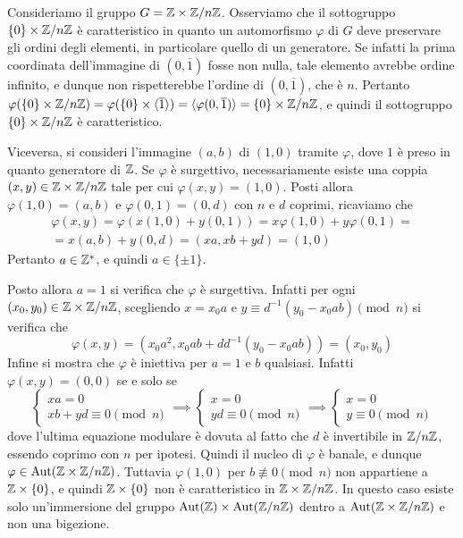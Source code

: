 \documentclass[11pt]{scrartcl}
\begin{document}
	\begin{example}
		Consideriamo il gruppo $G = \mathbb Z \times {\mathbb Z}/n{\mathbb Z}$. Osserviamo che il sottogruppo 
		$\{0\}\times {\mathbb Z}/n{\mathbb Z}$ è caratteristico in quanto un automorfismo $\varphi$ di $G$ deve
		preservare gli ordini degli elementi, in particolare quello di un generatore. Se
		infatti la prima coordinata dell'immagine di $(0, \overline{1})$ fosse non nulla,
		tale elemento avrebbe ordine infinito, e dunque non rispetterebbe l'ordine
		di $(0, \overline{1})$, che è $n$. 
		Pertanto $\varphi(\{0\} \times {\mathbb Z}/n{\mathbb Z}) = \varphi(\{0\} \times \langle \overline{1} \rangle) =
		\langle \varphi(0, \overline{1}) \rangle = \{0\} \times {\mathbb Z}/n{\mathbb Z}$, e quindi il
		sottogruppo $\{0\} \times {\mathbb Z}/n{\mathbb Z}$ è caratteristico. \medskip
		

        Viceversa, si consideri l'immagine $(a, b)$ di $(1, 0)$ tramite $\varphi$, dove $1$ è preso in quanto generatore
        di $\mathbb Z$. Se $\varphi$ è
		surgettivo, necessariamente esiste una coppia $(x, y) \in \mathbb Z\times {\mathbb Z}/n{\mathbb Z}$ tale per cui
		$\varphi(x, y) = (1, 0)$. Posti allora $\varphi(1, 0) = (a, b)$ e
		$\varphi(0, 1) = (0, d)$ con $n$ e $d$ coprimi, ricaviamo che
		\begin{multline*}
			\varphi(x, y) = \varphi(x(1, 0) + y(0, 1)) = x\varphi(1, 0) + y\varphi(0, 1) = \\
			= x(a, b) + y(0, d) = (xa, xb + yd) = (1, 0)
		\end{multline*}
		Pertanto $a \in \mathbb Z^*$, e quindi $a \in \{\pm 1\}$. \medskip
		

		Posto allora $a = 1$ si verifica che $\varphi$ è surgettiva. Infatti 
		per ogni $(x_0, y_0) \in \mathbb Z\times{\mathbb Z}/n{\mathbb Z}$, scegliendo
		$x = x_0a$ e $y \equiv d^{-1}(y_0 - x_0ab)\pmod n$ si verifica che \[
		\varphi(x, y) = (x_0a^2, x_0ab + d d^{-1}(y_0 - x_0ab)) = (x_0, y_0)
		\]
		Infine si mostra che $\varphi$ è iniettiva per $a = 1$ e
		$b$ qualsiasi. Infatti
		$\varphi(x, y) = (0, 0)$ se e solo se
		\[ \begin{cases}
			xa = 0 \\
			xb + yd \equiv 0 \pmod n
		\end{cases} \implies
		\begin{cases}
			x = 0 \\
			yd \equiv 0 \pmod n
		\end{cases} \implies
		\begin{cases}
			x = 0 \\
			y \equiv 0 \pmod n
		\end{cases}
		\]
		dove l'ultima equazione modulare è dovuta al fatto che $d$ è invertibile in
		${\mathbb Z}/n{\mathbb Z}$, essendo coprimo con $n$ per ipotesi. Quindi il nucleo di $\varphi$
		è banale, e dunque $\varphi \in \operatorname{Aut}(\mathbb Z \times {\mathbb Z}/n{\mathbb Z})$. Tuttavia
		$\varphi(1, 0)$ per $b \not\equiv 0 \pmod n$ non appartiene a $\mathbb Z \times \{0\}$, e quindi
		$\mathbb Z \times \{0\}$ non è caratteristico in $\mathbb Z \times {\mathbb Z}/n{\mathbb Z}$.
		 In questo caso esiste solo un'immersione del gruppo
		$\operatorname{Aut}(\mathbb Z) \times \operatorname{Aut}({\mathbb Z}/n{\mathbb Z})$ dentro a $\operatorname{Aut}(\mathbb Z\times {\mathbb Z}/n{\mathbb Z})$ e non una
		bigezione.
	\end{example}
	
\end{document}
